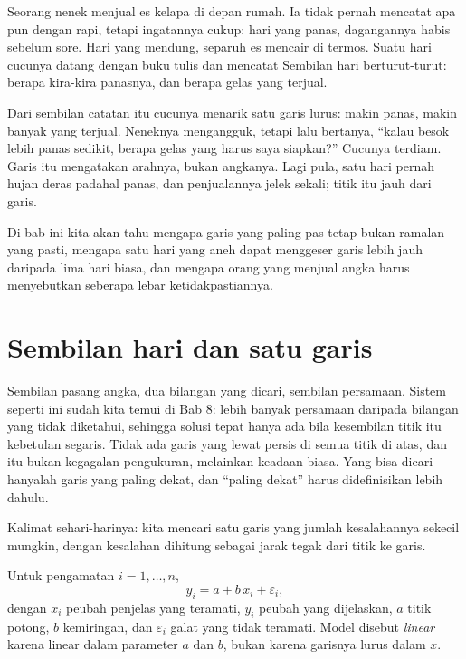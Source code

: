 \begin{untukanak}
Seorang nenek menjual es kelapa di depan rumah. Ia tidak pernah mencatat apa pun
dengan rapi, tetapi ingatannya cukup: hari yang panas, dagangannya habis sebelum
sore. Hari yang mendung, separuh es mencair di termos. Suatu hari cucunya datang
dengan buku tulis dan mencatat Sembilan hari berturut-turut: berapa kira-kira panasnya,
dan berapa gelas yang terjual.

Dari sembilan catatan itu cucunya menarik satu garis lurus: makin panas, makin banyak
yang terjual. Neneknya mengangguk, tetapi lalu bertanya, ``kalau besok lebih panas
sedikit, berapa gelas yang harus saya siapkan?'' Cucunya terdiam. Garis itu mengatakan
arahnya, bukan angkanya. Lagi pula, satu hari pernah hujan deras padahal panas, dan
penjualannya jelek sekali; titik itu jauh dari garis.

Di bab ini kita akan tahu mengapa garis yang paling pas tetap bukan ramalan yang pasti,
mengapa satu hari yang aneh dapat menggeser garis lebih jauh daripada lima hari biasa,
dan mengapa orang yang menjual angka harus menyebutkan seberapa lebar ketidakpastiannya.
\end{untukanak}

\section{Sembilan hari dan satu garis}

Sembilan pasang angka, dua bilangan yang dicari, sembilan persamaan. Sistem seperti ini
sudah kita temui di Bab 8: lebih banyak persamaan daripada bilangan yang tidak diketahui,
sehingga solusi tepat hanya ada bila kesembilan titik itu kebetulan segaris. Tidak ada
garis yang lewat persis di semua titik di atas, dan itu bukan kegagalan pengukuran,
melainkan keadaan biasa. Yang bisa dicari hanyalah garis yang paling dekat, dan
``paling dekat'' harus didefinisikan lebih dahulu.

Kalimat sehari-harinya: kita mencari satu garis yang jumlah kesalahannya sekecil mungkin,
dengan kesalahan dihitung sebagai jarak tegak dari titik ke garis.


\begin{definisi}
Untuk pengamatan $i=1,\dots,n$,
\[
y_i = a + b\,x_i + \varepsilon_i ,
\]
dengan $x_i$ peubah penjelas yang teramati, $y_i$ peubah yang dijelaskan, $a$ titik
potong, $b$ kemiringan, dan $\varepsilon_i$ galat yang tidak teramati. Model disebut
\emph{linear} karena linear dalam parameter $a$ dan $b$, bukan karena garisnya lurus
dalam $x$.
\end{definisi}

